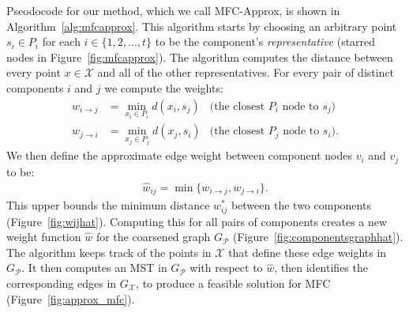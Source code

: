 Pseodocode for our method, which we call \textsf{MFC-Approx}, is shown in Algorithm~\ref{alg:mfcapprox}. This algorithm starts by choosing an arbitrary point $s_i \in P_i$ for each $i \in \{1,2, \hdots, t\}$ to be the component's \emph{representative} (starred nodes in Figure~\ref{fig:mfcapprox}). 
The algorithm computes the distance between every point $x \in \mathcal{X}$ and all of the other representatives. For every pair of distinct components $i$ and $j$ we compute the weights:
\begin{align}
	w_{i \rightarrow j} &= \min_{x_i \in P_i} d(x_i, s_j)  	&\text{(the closest $P_i$ node to $s_j$)} \\
	w_{j \rightarrow i} &= \min_{x_j \in P_j} d(x_j, s_i)  &\text{(the closest $P_j$ node to $s_i$).} 
\end{align}
We then define the approximate edge weight between component nodes $v_i$ and $v_j$ to be:
\begin{align}
	\label{eq:approxweight}
	\hat{w}_{ij} = \min \{w_{i \rightarrow j}, w_{j \rightarrow i}\}.
\end{align}
This upper bounds the minimum distance $w_{ij}^*$ between the two components (Figure~\ref{fig:wijhat}).
Computing this for all pairs of components creates a new weight function $\hat{w}$ for the
coarsened graph $G_\mathcal{P}$ (Figure~\ref{fig:componentsgraphhat}). The algorithm keeps track of the points in $\mathcal{X}$ that define these edge weights in $G_\mathcal{P}$. It then computes an MST in $G_\mathcal{P}$ with respect to $\hat{w}$, then identifies the corresponding edges in $G_\mathcal{X}$, to produce a feasible solution for MFC (Figure~\ref{fig:approx_mfc}). 






